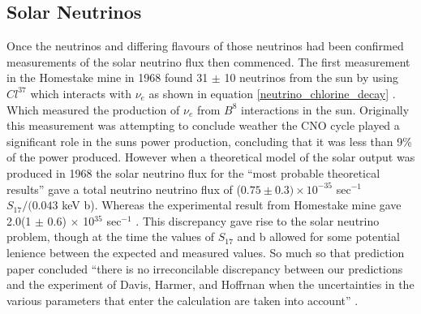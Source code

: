\documentclass[12pt,a4paper]{article}
\begin{document}
\subsection{Solar Neutrinos}
Once the neutrinos and differing flavours of those neutrinos had been confirmed \cite{DanbyG1962PhysRevLett.9.36} measurements of the solar neutrino flux then commenced. The first measurement in the Homestake mine in 1968 found 31 $\pm$ 10 neutrinos from the sun \cite{davis1968homestake} by using $Cl^{37}$ which interacts with $\nu_e$ as shown in equation \ref{neutrino_chlorine_decay} \cite{Bellerive:2003rj}. Which measured the production of $\nu_e$ from $B^8$ interactions in the sun. Originally this measurement was attempting to conclude weather the CNO cycle played a significant role in the suns power production, concluding that it was less than 9\% of the power produced. However when a theoretical model of the solar output was produced in 1968 \cite{bahcall1968present} the solar neutrino flux for the ``most probable theoretical results'' gave a total neutrino neutrino flux of ($0.75 \pm 0.3) \times 10^{-35}$ sec$^{-1}$ $S_{17}/(0.043$ keV b). Whereas the experimental result from Homestake mine gave 2.0(1 $\pm$ 0.6) $\times$ 10$^{35}$ sec$^{-1}$ \cite{davis1968homestake}. This discrepancy gave rise to the solar neutrino problem, though at the time the values of $S_{17}$ and b allowed for some potential lenience between the expected and measured values. So much so that prediction paper concluded ``there is no irreconcilable discrepancy between our predictions and the experiment of Davis, Harmer, and Hoffrnan when the uncertainties in the various parameters that enter the calculation are taken into account'' \cite{bahcall1968present}.
\end{document}
